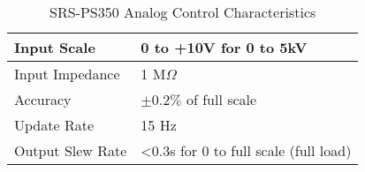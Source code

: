 \begin{table}[ht!]
\centering
\begin{tabular}{| l | l | }
\hline
Input Scale      & 0 to +10V for 0 to 5kV                          \\ \hline
Input Impedance  & 1 M$\Omega$                                     \\ \hline
Accuracy         & $\pm 0.2\%$ of full scale                       \\ \hline
Update Rate      & 15 Hz                                           \\ \hline
Output Slew Rate & \textless 0.3s for 0 to full scale (full load)  \\ \hline
\end{tabular}
\caption{SRS-PS350 Analog Control Characteristics \cite{srsManual}\cite{srsCatalog}}
\label{srsCtrl_table}
\end{table}
